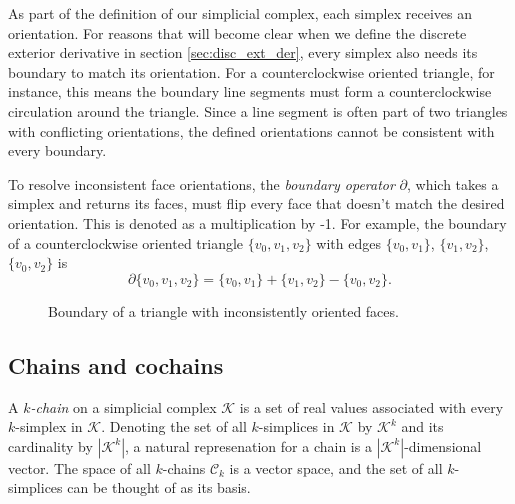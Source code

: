 \documentclass[utf8,english]{gradu3}
\begin{document}
As part of the definition of our simplicial complex,
each simplex receives an orientation.
For reasons that will become clear when
we define the discrete exterior derivative in section \ref{sec:disc_ext_der},
every simplex also needs its boundary to match its orientation.
For a counterclockwise oriented triangle, for instance,
this means the boundary line segments must form
a counterclockwise circulation around the triangle.
Since a line segment is often part of two triangles with conflicting orientations,
the defined orientations cannot be consistent with every boundary.

To resolve inconsistent face orientations,
the \textit{boundary operator} $\partial$,
which takes a simplex and returns its faces,
must flip every face that doesn't match the desired orientation.
This is denoted as a multiplication by -1.
For example, the boundary of a counterclockwise oriented triangle $\{v_0, v_1, v_2\}$
with edges $\{v_0, v_1\}$, $\{v_1, v_2\}$, $\{v_0, v_2\}$ is
\[
  \partial \{v_0, v_1, v_2\} = \{v_0, v_1\} + \{v_1, v_2\} - \{v_0, v_2\}.
\]

\begin{figure}[h]
  \centering
  \caption{
    \label{fig:triangle_boundary}
    Boundary of a triangle with inconsistently oriented faces.
  }
\end{figure}


\subsection{Chains and cochains}\label{sec:chains}

A \textit{$k$-chain} on a simplicial complex $\mathcal{K}$
is a set of real values associated with every $k$-simplex in $\mathcal{K}$.
Denoting the set of all $k$-simplices in $\mathcal{K}$ by $\mathcal{K}^k$
and its cardinality by $|\mathcal{K}^k|$,
a natural represenation for a chain is a $|\mathcal{K}^k|$-dimensional vector.
The space of all $k$-chains $\mathcal{C}_k$ is a vector space,
and the set of all $k$-simplices can be thought of as its basis.
\end{document}
